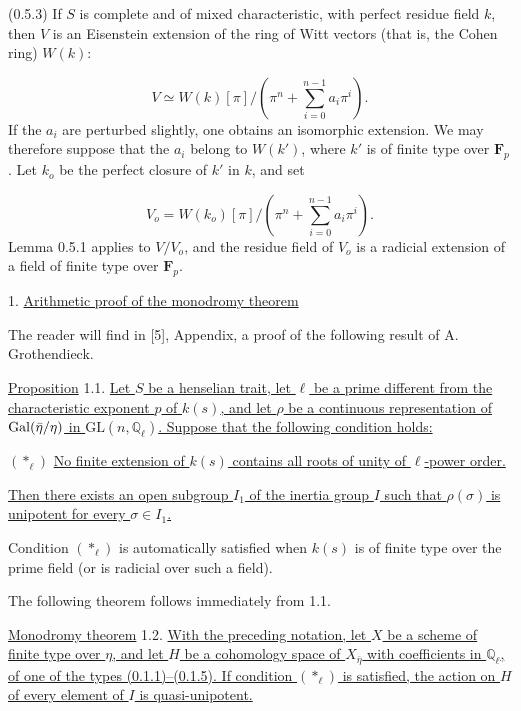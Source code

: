 (0.5.3) If $S$ is complete and of mixed characteristic, with perfect residue field $k$, then $V$ is an Eisenstein extension of the ring of Witt vectors (that is, the Cohen ring) $W(k)$:

\begin{equation*}
V\simeq W(k)[\pi]/\left(\pi^n+\sum_{i=0}^{n-1}a_i\pi^i\right).
\end{equation*}
If the $a_i$ are perturbed slightly, one obtains an isomorphic extension. We may therefore suppose that the $a_i$ belong to $W(k')$, where $k'$ is of finite type over $\mathbf{F}_p$. Let $k_o$ be the perfect closure of $k'$ in $k$, and set

\begin{equation*}
V_o=W(k_o)[\pi]/\left(\pi^n+\sum_{i=0}^{n-1}a_i\pi^i\right).
\end{equation*}
Lemma 0.5.1 applies to $V/V_o$, and the residue field of $V_o$ is a radicial extension of a field of finite type over $\mathbf{F}_p$.

1. \underline{Arithmetic proof of the monodromy theorem}

The reader will find in [5], Appendix, a proof of the following result of A. Grothendieck.

\underline{Proposition} 1.1. \underline{Let $S$ be a henselian trait, let $\ell$ be a prime different from the characteristic exponent $p$ of $k(s)$, and let $\rho$ be a continuous representation of $\operatorname{Gal}(\bar\eta/\eta)$ in $\mathrm{GL}(n,\mathbb{Q}_\ell)$. Suppose that the following condition holds:}

$(*_\ell)$ \quad \underline{No finite extension of $k(s)$ contains all roots of unity of $\ell$-power order.}


\underline{Then there exists an open subgroup $I_1$ of the inertia group $I$ such that $\rho(\sigma)$ is unipotent for every $\sigma\in I_1$.}

Condition $(*_\ell)$ is automatically satisfied when $k(s)$ is of finite type over the prime field (or is radicial over such a field).

The following theorem follows immediately from 1.1.

\underline{Monodromy theorem} 1.2. \underline{With the preceding notation, let $X$ be a scheme of finite type over $\eta$, and let $H$ be a cohomology space of $X_{\bar\eta}$ with coefficients in $\mathbb{Q}_\ell$, of one of the types (0.1.1)--(0.1.5). If condition $(*_\ell)$ is satisfied, the action on $H$ of every element of $I$ is quasi-unipotent.}

